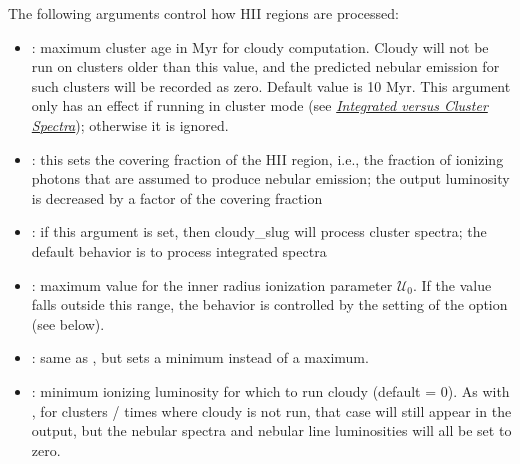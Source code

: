 \documentclass[letterpaper,10pt,english]{sphinxmanual}
\begin{document}
The following arguments control how HII regions are processed:
\begin{itemize}
\item {} 
: maximum cluster age in Myr for
cloudy computation. Cloudy will not be run on clusters older than
this value, and the predicted nebular emission for such clusters
will be recorded as zero. Default value is 10 Myr. This argument only
has an effect if running in cluster mode (see
{\hyperref[cloudy:sssec\string-cloudy\string-integrated\string-cluster]{\emph{Integrated versus Cluster Spectra}}}); otherwise it is ignored.

\item {} 
: this sets the
covering fraction of the HII region, i.e., the fraction of ionizing
photons that are assumed to produce nebular emission; the output
luminosity is decreased by a factor of the covering fraction

\item {} 
: if this argument is set, then cloudy\_slug
will process cluster spectra; the default behavior is to process
integrated spectra

\item {} 
: maximum value for the inner radius
ionization parameter \(\mathcal{U}_0\). If the value falls
outside this range, the behavior is controlled by the setting of the
 option (see below).

\item {} 
: same as , but sets a
minimum instead of a maximum.

\item {} 
: minimum ionizing luminosity for
which to run cloudy (default = 0). As with , for
clusters / times where cloudy is not run, that case will still
appear in the output, but the nebular spectra and nebular line
luminosities will all be set to zero.

\end{itemize}
\end{document}

